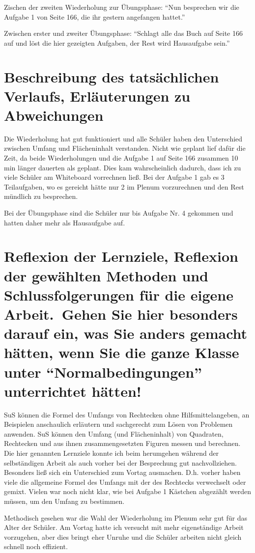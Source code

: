 \documentclass[11pt]{scrartcl}
\begin{document}
Zischen der zweiten Wiederholung zur Übungsphase:
\enquote{Nun besprechen wir die Aufgabe 1 von Seite 166, die ihr gestern angefangen hattet.}

Zwischen erster und zweiter Übungsphase:
\enquote{Schlagt alle das Buch auf Seite 166 auf und löst die hier gezeigten Aufgaben, der Rest wird Hausaufgabe sein.}

\newpage
\section{Beschreibung des tatsächlichen Verlaufs, Erläuterungen zu Abweichungen}
Die Wiederholung hat gut funktioniert und alle Schüler haben den Unterschied zwischen Umfang und Flächeninhalt verstanden. Nicht wie geplant lief dafür die Zeit, da beide Wiederholungen und die Aufgabe 1 auf Seite 166 zusammen 10 min länger dauerten als geplant. Dies kam wahrscheinlich dadurch, dass ich zu viele Schüler am Whiteboard vorrechnen ließ.
Bei der Aufgabe 1 gab es 3 Teilaufgaben, wo es gereicht hätte nur 2 im Plenum vorzurechnen und den Rest mündlich zu besprechen.

Bei der Übungsphase sind die Schüler nur bis Aufgabe Nr. 4 gekommen und hatten daher mehr als Hausaufgabe auf.

\newpage
\section{Reflexion der Lernziele, Reflexion der gewählten Methoden und Schlussfolgerungen für die eigene Arbeit. Gehen Sie hier besonders darauf ein, was Sie anders gemacht hätten, wenn Sie die ganze Klasse unter \enquote{Normalbedingungen} unterrichtet hätten!}
SuS können die Formel des Umfangs von Rechtecken ohne Hilfsmittelangeben, an Beispielen anschaulich erläutern und sachgerecht zum Lösen von Problemen anwenden. SuS können den Umfang (und Flächeninhalt) von Quadraten, Rechtecken und aus ihnen zusammengesetzten Figuren messen und berechnen.
Die hier genannten Lernziele konnte ich beim herumgehen während der selbständigen Arbeit als auch vorher bei der Besprechung gut nachvollziehen.
Besonders ließ sich ein Unterschied zum Vortag ausmachen. D.h. vorher haben viele die allgemeine Formel des Umfangs mit der des Rechtecks verwechselt oder gemixt. Vielen war noch nicht klar, wie bei Aufgabe 1 Kästchen abgezählt werden müssen, um den Umfang zu bestimmen.

Methodisch gesehen war die Wahl der Wiederholung im Plenum sehr gut für das Alter der Schüler. Am Vortag hatte ich versucht mit mehr eigenständige Arbeit vorzugehen, aber dies bringt eher Unruhe und die Schüler arbeiten nicht gleich schnell noch effizient.
\end{document}
